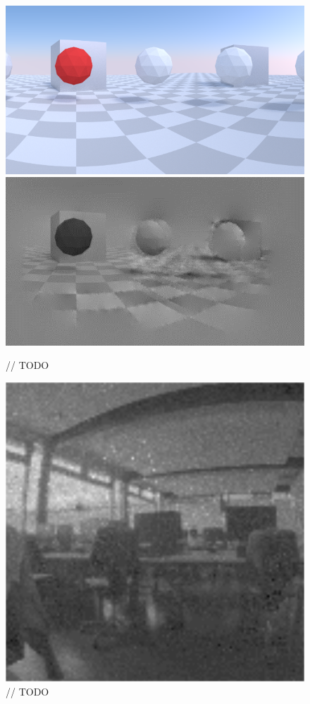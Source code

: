 \begin{figure}
\label{fig:zigzag_reconstruction}
\includegraphics[width=\columnwidth]{images/zigzag_input.png}
\includegraphics[width=\columnwidth]{images/zigzag_reconstruction.png}
\caption{// TODO}
\end{figure}

\begin{figure}
\label{fig:shutter_integration}
\includegraphics[width=\linewidth]{images/PCLab_integrated.png}
\caption{// TODO}
\end{figure}
